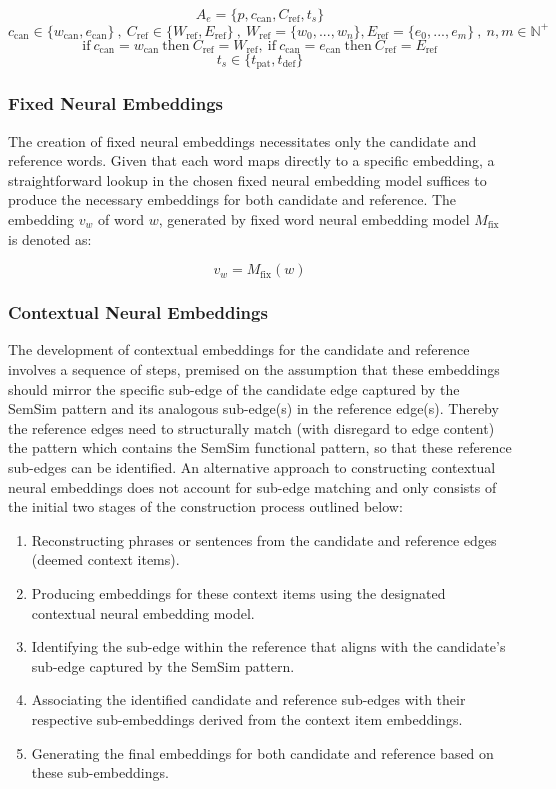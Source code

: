 \documentclass[11pt]{scrreprt}
\begin{document}
\[ A_e = \{p, c_\text{can}, C_\text{ref}, t_s\} \]
\[ c_\text{can} \in \{w_\text{can}, e_\text{can}\} \ ,\ C_\text{ref} \in \{W_\text{ref}, E_\text{ref}\}\ ,\ W_\text{ref} = \{w_0, ..., w_n\}, E_\text{ref} = \{e_0, ..., e_m\} \ ,\ n,m \in \mathbb{N}^+
\]
\[ 
\text{if} \  c_\text{can} = w_\text{can} \ \text{then} \ C_\text{ref} = W_\text{ref},\ 
\text{if} \  c_\text{can} = e_\text{can} \ \text{then} \ C_\text{ref} = E_\text{ref} 
\]
\[
t_s \in \{t_\text{pat}, t_\text{def}\}
\]

\subsubsection{Fixed Neural Embeddings}
The creation of fixed neural embeddings necessitates only the candidate and reference words. Given that each word maps directly to a specific embedding, a straightforward lookup in the chosen fixed neural embedding model suffices to produce the necessary embeddings for both candidate and reference. The embedding \(v_w\) of word \(w\), generated by fixed word neural embedding model \(M_\text{fix}\) is denoted as:

\[v_w = M_\text{fix}(w) \]

\subsubsection{Contextual Neural Embeddings}
The development of contextual embeddings for the candidate and reference involves a sequence of steps, premised on the assumption that these embeddings should mirror the specific sub-edge of the candidate edge captured by the SemSim pattern and its analogous sub-edge(s) in the reference edge(s). Thereby the reference edges need to structurally match (with disregard to edge content) the pattern which contains the SemSim functional pattern, so that these reference sub-edges can be identified. An alternative approach to constructing contextual neural embeddings does not account for sub-edge matching and only consists of the initial two stages of the construction process outlined below:

\begin{enumerate}
	\item Reconstructing phrases or sentences from the candidate and reference edges (deemed context items).
    \item Producing embeddings for these context items using the designated contextual neural embedding model.
    \item Identifying the sub-edge within the reference that aligns with the candidate's sub-edge captured by the SemSim pattern.
    \item Associating the identified candidate and reference sub-edges with their respective sub-embeddings derived from the context item embeddings.
    \item Generating the final embeddings for both candidate and reference based on these sub-embeddings.
\end{enumerate}
\end{document}
